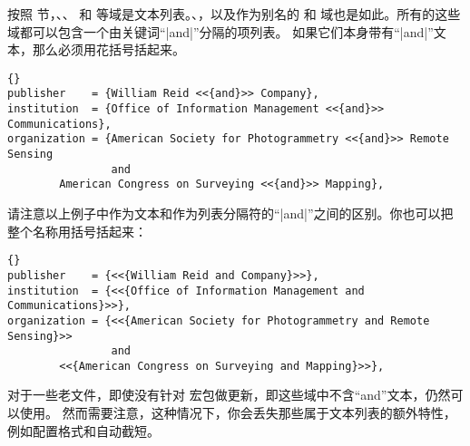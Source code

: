 
按照  节，、、 和  等域是文本列表。、，以及作为别名的  和  域也是如此。所有的这些域都可以包含一个由关键词“|and|”分隔的项列表。
如果它们本身带有“|and|”文本，那么必须用花括号括起来。

\begin{lstlisting}[style=bibtex]{}
publisher    = {William Reid <<{and}>> Company},
institution  = {Office of Information Management <<{and}>> Communications},
organization = {American Society for Photogrammetry <<{and}>> Remote Sensing
                and
		American Congress on Surveying <<{and}>> Mapping},
\end{lstlisting}
%
请注意以上例子中作为文本和作为列表分隔符的“|and|”之间的区别。你也可以把整个名称用括号括起来：

\begin{lstlisting}[style=bibtex]{}
publisher    = {<<{William Reid and Company}>>},
institution  = {<<{Office of Information Management and Communications}>>},
organization = {<<{American Society for Photogrammetry and Remote Sensing}>>
                and
		<<{American Congress on Surveying and Mapping}>>},
\end{lstlisting}
%
对于一些老文件，即使没有针对 \biblatex 宏包做更新，即这些域中不含“and”文本，仍然可以使用。
然而需要注意，这种情况下，你会丢失那些属于文本列表的额外特性，例如配置格式和自动截短。

